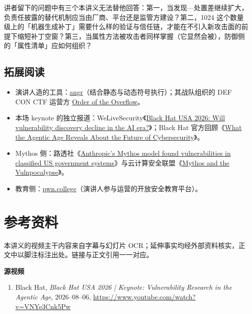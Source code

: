 \documentclass[a4paper,11pt]{article}
\begin{document}
讲者留下的问题中有三个本讲义无法替他回答：第一，当发现—处置差继续扩大，负责任披露的替代机制应当由厂商、平台还是监管方建设？第二，1024 这个数量级上的「机器生成补丁」需要什么样的验证与信任链，才能在不引入新攻击面的前提下缩短补丁空窗？第三，当属性方法被攻击者同样掌握（它显然会被），防御侧的「属性清单」应如何组织？

\subsection{拓展阅读}

\begin{itemize}
\item 演讲人造的工具：\href{https://angr.io/}{angr}（结合静态与动态符号执行）；其战队组织的 DEF CON CTF 运营方 \href{https://oooverflow.io/philosophy.html}{Order of the Overflow}。
\item 本场 keynote 的独立报道：WeLiveSecurity《\href{https://www.welivesecurity.com/en/business-security/black-hat-usa-2026-vulnerability-discovery-decline-ai-era/}{Black Hat USA 2026: Will vulnerability discovery decline in the AI era?}》；Black Hat 官方回顾《\href{https://blackhat.com/html/blog/2026-09-01.html}{What the Agentic Age Reveals About the Future of Cybersecurity}》。
\item Mythos 侧：路透社《\href{https://www.reuters.com/business/anthropics-mythos-model-found-vulnerabilities-classified-us-government-systems-2026-06-24/}{Anthropic's Mythos model found vulnerabilities in classified US government systems}》与云计算安全联盟《\href{https://cloudsecurityalliance.org/blog/2026/04/08/anthropic-s-mythos-is-here-defending-from-the-vulnpocalypse}{Mythos and the Vulnpocalypse}》。
\item 教育侧：\href{https://pwn.college/}{pwn.college}（演讲人参与运营的开放安全教育平台）。
\end{itemize}

\section{参考资料}

本讲义的视频主干内容来自字幕与幻灯片 OCR；延伸事实均经外部资料核实，正文中以脚注标注出处。链接与正文引用一一对应。

\textbf{源视频}

\begin{enumerate}
\item Black Hat, \emph{Black Hat USA 2026 | Keynote: Vulnerability Research in the Agentic Age}, 2026--08--06, \href{https://www.youtube.com/watch?v=VNYe3Cnk5Pw}{https://www.youtube.com/watch?v=VNYe3Cnk5Pw}
\end{enumerate}
\end{document}
